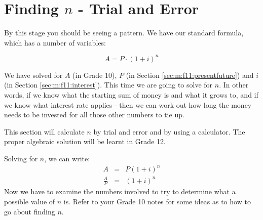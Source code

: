 
\section{Finding $n$ - Trial and Error}
\label{sec:m:f11:term}
By this stage you should be seeing a pattern. We have our standard formula, which has a number of variables:

\begin{equation*}
A = P \cdot (1+i)^n
\end{equation*}

We have solved for $A$ (in Grade 10), $P$ (in Section \ref{sec:m:f11:presentfuture}) and $i$ (in Section \ref{sec:m:f11:interest}). This time we are going to solve for $n$. In other words, if we know what the starting sum of money is and what it grows to, and if we know what interest rate applies - then we can work out how long the money needs to be invested for all those other numbers to tie up.

This section will calculate $n$ by trial and error and by using a calculator. The proper algebraic solution will be learnt in Grade 12.

Solving for $n$, we can write:
\begin{eqnarray*}
A &=& P(1+i)^n\\
\frac{A}{P}&=&(1+i)^n
\end{eqnarray*}
Now we have to examine the numbers involved to try to determine what a possible value of $n$ is. Refer to your Grade 10 notes for some ideas as to how to go about finding $n$.


